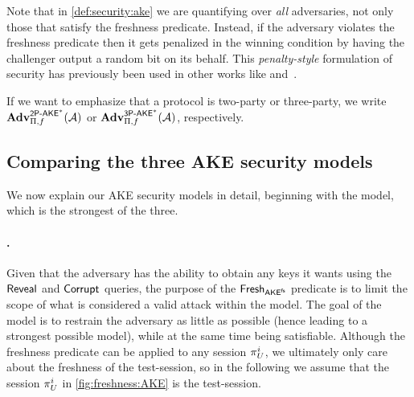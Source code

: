 Note that in \cref{def:security:ake} we are quantifying over \emph{all} adversaries,
not only those that satisfy the freshness predicate.
Instead,
if the adversary violates the freshness predicate then it gets penalized in the winning condition by having the challenger output a random bit on its behalf.   
This \emph{penalty-style} formulation of security has previously been used in other works like \cite{JC:BelHofKil15} and~\cite{EPRINT:GeoRac13}.



If we want to emphasize that a protocol is two-party or three-party,
we write $\mathbf{Adv}_{\mathrm{\Pi},f}^{\operatorname{\mathsf{2P-AKE}}^*}(\mathcal{A})$
or $\mathbf{Adv}_{\mathrm{\Pi},f}^{\operatorname{\mathsf{3P-AKE}}^*}(\mathcal{A})$,
respectively.




\subsection{Comparing the three AKE security models}

We now explain our AKE security models in detail,
beginning with the \akefstext model,
which is the strongest of the three.



\paragraph{\texorpdfstring{\akefstext}{AKEfs}.}
Given that the adversary has the ability to obtain any keys it wants using the $\mathsf{Reveal}$ and $\mathsf{Corrupt}$ queries,
the purpose of the $\mathsf{Fresh}_{\mathsf{AKE}^{\mathsf{fs}}}$ predicate is to limit the scope of what is considered a valid attack within the model.
The goal of the \akefstext model is to restrain the adversary as little as possible
(hence leading to a strongest possible model),
while at the same time being satisfiable.
Although the freshness predicate can be applied to any session $\oracle[U][i]$,
we ultimately only care about the freshness of the test-session,
so in the following we assume that the session $\oracle[U][i]$ in \cref{fig:freshness:AKE} is the test-session.


